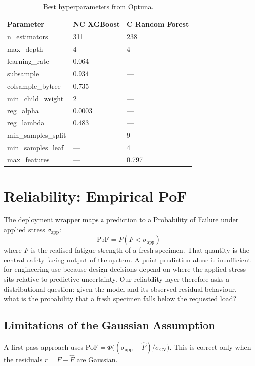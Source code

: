 \documentclass[12pt,a4paper]{article} %
\begin{document}
\begin{table}[H]
\centering
\caption{Best hyperparameters from Optuna.}
\label{tab:hparams}
\begin{tabular}{lll}
\toprule
\textbf{Parameter} & \textbf{NC XGBoost} & \textbf{C Random Forest} \\
\midrule
n\_estimators       & 311                 & 238 \\
max\_depth          & 4                   & 4 \\
learning\_rate      & 0.064               & --- \\
subsample           & 0.934               & --- \\
colsample\_bytree   & 0.735               & --- \\
min\_child\_weight  & 2                   & --- \\
reg\_alpha          & 0.0003              & --- \\
reg\_lambda         & 0.483               & --- \\
min\_samples\_split & ---                 & 9 \\
min\_samples\_leaf  & ---                 & 4 \\
max\_features       & ---                 & 0.797 \\
\bottomrule
\end{tabular}
\end{table}


\section{Reliability: Empirical PoF}\label{sec:reliability}

The deployment wrapper maps a prediction to a Probability of Failure under applied stress
$\sigma_{\text{app}}$:
\[
  \text{PoF} = P(F < \sigma_{\text{app}})
\]
where $F$ is the realised fatigue strength of a fresh specimen.
That quantity is the central safety-facing output of the system. A point prediction alone
is insufficient for engineering use because design decisions depend on where the applied
stress sits relative to predictive uncertainty. Our reliability layer therefore asks a
distributional question: given the model and its observed residual behaviour, what is the
probability that a fresh specimen falls below the requested load?

\subsection{Limitations of the Gaussian Assumption}
A first-pass approach uses
$\text{PoF} = \Phi\!\big((\sigma_{\text{app}} - \hat{F}) / \sigma_{\text{CV}}\big)$.
This is correct only when the residuals $r = F - \hat{F}$ are Gaussian.
\end{document}
